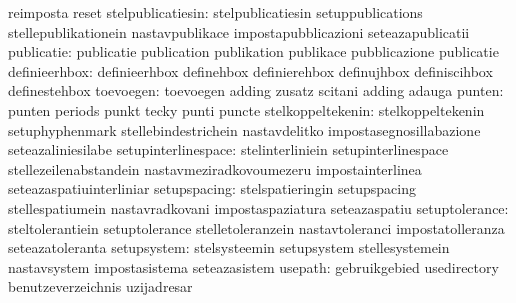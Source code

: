                                   reimposta                        reset
               stelpublicatiesin: stelpublicatiesin                setuppublications
                                  stellepublikationein             nastavpublikace
                                  impostapubblicazioni             seteazapublicatii
                      publicatie: publicatie                       publication
                                  publikation                      publikace
                                  pubblicazione                    publicatie
                   definieerhbox: definieerhbox                    definehbox
                                  definierehbox                    definujhbox
                                  definiscihbox                    definestehbox
                       toevoegen: toevoegen                        adding
                                  zusatz                           scitani
                                  adding                           adauga %
                          punten: punten                           periods
                                  punkt                            tecky
                                  punti                            puncte
               stelkoppeltekenin: stelkoppeltekenin                setuphyphenmark
                                  stellebindestrichein             nastavdelitko
                                  impostasegnosillabazione         seteazaliniesilabe %
             setupinterlinespace: stelinterliniein                 setupinterlinespace
                                  stellezeilenabstandein           nastavmeziradkovoumezeru
                                  impostainterlinea                seteazaspatiuinterliniar
                    setupspacing: stelspatieringin                 setupspacing
                                  stellespatiumein                 nastavradkovani
                                  impostaspaziatura                seteazaspatiu
                  setuptolerance: steltolerantiein                 setuptolerance
                                  stelletoleranzein                nastavtoleranci
                                  impostatolleranza                seteazatoleranta
                     setupsystem: stelsysteemin                    setupsystem
                                  stellesystemein                  nastavsystem
                                  impostasistema                   seteazasistem
                         usepath: gebruikgebied                    usedirectory
                                  benutzeverzeichnis               uzijadresar %
